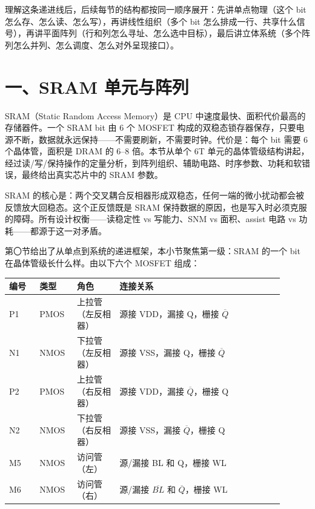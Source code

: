 理解这条递进线后，后续每节的结构都按同一顺序展开：先讲单点物理（这个 bit 怎么存、怎么读、怎么写），再讲线性组织（多个 bit 怎么排成一行、共享什么信号），再讲平面阵列（行和列怎么寻址、怎么选中目标），最后讲立体系统（多个阵列怎么并列、怎么调度、怎么对外呈现接口）。

\section{一、SRAM 单元与阵列}

SRAM（Static Random Access Memory）是 CPU 中速度最快、面积代价最高的存储器件。一个 SRAM bit 由 6 个 MOSFET 构成的双稳态锁存器保存，只要电源不断，数据就永远保持——不需要刷新，不需要时钟。代价是：每个 bit 需要 6 个晶体管，面积是 DRAM 的 6--8 倍。本节从单个 6T 单元的晶体管级结构讲起，经过读/写/保持操作的定量分析，到阵列组织、辅助电路、时序参数、功耗和软错误，最终给出真实芯片中的 SRAM 参数。

\begin{keyidea}
SRAM 的核心是：两个交叉耦合反相器形成双稳态，任何一端的微小扰动都会被反馈放大回稳态。这个正反馈既是 SRAM 保持数据的原因，也是写入时必须克服的障碍。所有设计权衡——读稳定性 vs 写能力、SNM vs 面积、assist 电路 vs 功耗——都源于这一对矛盾。
\end{keyidea}


第〇节给出了从单点到系统的递进框架，本小节聚焦第一级：SRAM 的一个 bit 在晶体管级长什么样。由以下六个 MOSFET 组成：

\begin{longtable}{L{0.10\linewidth}L{0.12\linewidth}L{0.14\linewidth}L{0.54\linewidth}}
\toprule
编号 & 类型 & 角色 & 连接关系 \\
\midrule
P1 & PMOS & 上拉管（左反相器） & 源接 VDD，漏接 Q，栅接 $\overline{Q}$ \\
N1 & NMOS & 下拉管（左反相器） & 源接 VSS，漏接 Q，栅接 $\overline{Q}$ \\
P2 & PMOS & 上拉管（右反相器） & 源接 VDD，漏接 $\overline{Q}$，栅接 Q \\
N2 & NMOS & 下拉管（右反相器） & 源接 VSS，漏接 $\overline{Q}$，栅接 Q \\
M5 & NMOS & 访问管（左） & 源/漏接 BL 和 Q，栅接 WL \\
M6 & NMOS & 访问管（右） & 源/漏接 $\overline{BL}$ 和 $\overline{Q}$，栅接 WL \\
\bottomrule
\end{longtable}

